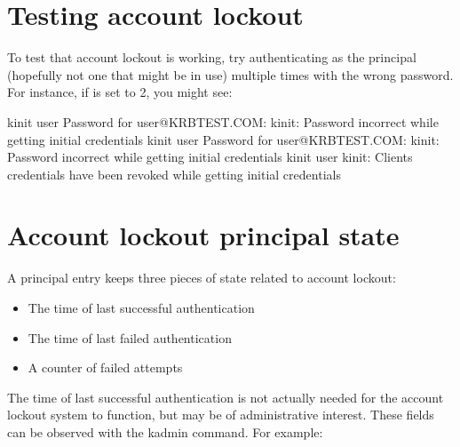 \documentclass[letterpaper,10pt,english]{sphinxmanual}
\begin{document}
\section{Testing account lockout}
\label{\detokenize{admin/lockout:testing-account-lockout}}
\sphinxAtStartPar
To test that account lockout is working, try authenticating as the
principal (hopefully not one that might be in use) multiple times with
the wrong password.  For instance, if  is set to 2, you
might see:

\begin{sphinxVerbatim}[commandchars=\\\{\}]
\PYGZdl{} kinit user
Password for user@KRBTEST.COM:
kinit: Password incorrect while getting initial credentials
\PYGZdl{} kinit user
Password for user@KRBTEST.COM:
kinit: Password incorrect while getting initial credentials
\PYGZdl{} kinit user
kinit: Client\PYGZsq{}s credentials have been revoked while getting initial credentials
\end{sphinxVerbatim}


\section{Account lockout principal state}
\label{\detokenize{admin/lockout:account-lockout-principal-state}}
\sphinxAtStartPar
A principal entry keeps three pieces of state related to account
lockout:
\begin{itemize}
\item {} 
\sphinxAtStartPar
The time of last successful authentication

\item {} 
\sphinxAtStartPar
The time of last failed authentication

\item {} 
\sphinxAtStartPar
A counter of failed attempts

\end{itemize}

\sphinxAtStartPar
The time of last successful authentication is not actually needed for
the account lockout system to function, but may be of administrative
interest.  These fields can be observed with the  kadmin
command.  For example:

\begin{sphinxVerbatim}[commandchars=\\\{\}]
  
 
   \PYG{p}{[}\PYG{p}{]}
        
   
\end{sphinxVerbatim}
\end{document}
